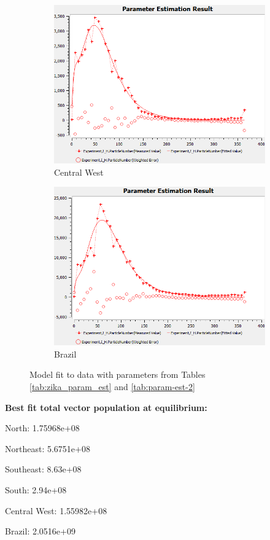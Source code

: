 \documentclass[10pt,letterpaper]{article}
\begin{document}
\begin{figure}
\begin{subfigure}[b]{0.3\textwidth}
         \includegraphics[width=\textwidth]{Zika_PE_figs/centralwest_PE_0419.png}
         \caption{Central West}
         \label{fig:CW_PE}
     \end{subfigure}
      \hfill
     \begin{subfigure}[b]{0.3\textwidth}
         \centering
         \includegraphics[width=\textwidth]{Zika_PE_figs/brazil_PE_0419.png}
         \caption{Brazil}
         \label{fig:brazil_PE}
     \end{subfigure}
        \caption{Model fit to data with parameters from Tables \ref{tab:zika_param_est} and \ref{tab:param-est-2}}
        \label{fig:PE_figs}
\end{figure}
\textbf{Best fit total vector population at equilibrium:}

North: 1.75968e+08

Northeast: 5.6751e+08

Southeast: 8.63e+08

South: 2.94e+08

Central West: 1.55982e+08

Brazil: 2.0516e+09
\end{document}
